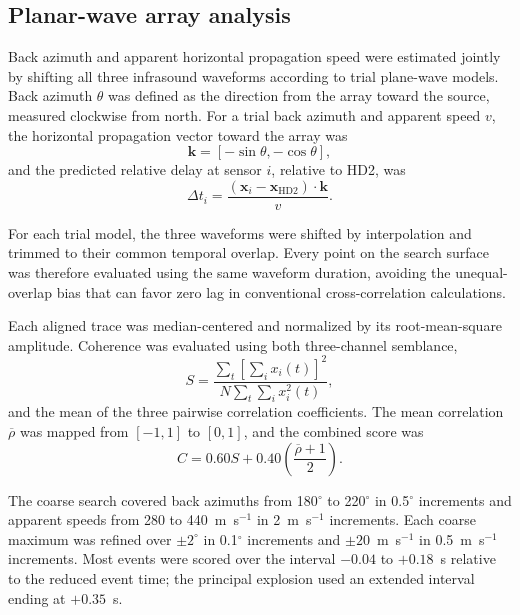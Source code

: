 \documentclass[]{seismica}
\begin{document}
\subsection{Planar-wave array analysis}

Back azimuth and apparent horizontal propagation speed were estimated jointly by shifting all three infrasound waveforms according to trial plane-wave models. Back azimuth $\theta$ was defined as the direction from the array toward the source, measured clockwise from north. For a trial back azimuth and apparent speed $v$, the horizontal propagation vector toward the array was
\begin{equation}
  \mathbf{k} = [-\sin\theta,-\cos\theta],
  \label{eq:propagation_vector}
\end{equation}
and the predicted relative delay at sensor $i$, relative to HD2, was
\begin{equation}
  \Delta t_i = \frac{(\mathbf{x}_i-\mathbf{x}_{\mathrm{HD2}})\cdot\mathbf{k}}{v}.
  \label{eq:plane_delay}
\end{equation}

For each trial model, the three waveforms were shifted by interpolation and trimmed to their common temporal overlap. Every point on the search surface was therefore evaluated using the same waveform duration, avoiding the unequal-overlap bias that can favor zero lag in conventional cross-correlation calculations.

Each aligned trace was median-centered and normalized by its root-mean-square amplitude. Coherence was evaluated using both three-channel semblance,
\begin{equation}
  S = \frac{\sum_t\left[\sum_i x_i(t)\right]^2}{N\sum_t\sum_i x_i^2(t)},
  \label{eq:semblance}
\end{equation}
and the mean of the three pairwise correlation coefficients. The mean correlation $\overline{\rho}$ was mapped from $[-1,1]$ to $[0,1]$, and the combined score was
\begin{equation}
  C = 0.60S + 0.40\left(\frac{\overline{\rho}+1}{2}\right).
  \label{eq:coherence_score}
\end{equation}

The coarse search covered back azimuths from 180$^\circ$ to 220$^\circ$ in 0.5$^\circ$ increments and apparent speeds from 280 to 440~m~s$^{-1}$ in 2~m~s$^{-1}$ increments. Each coarse maximum was refined over $\pm2^\circ$ in 0.1$^\circ$ increments and $\pm20$~m~s$^{-1}$ in 0.5~m~s$^{-1}$ increments. Most events were scored over the interval $-0.04$ to $+0.18$~s relative to the reduced event time; the principal explosion used an extended interval ending at $+0.35$~s.
\end{document}
